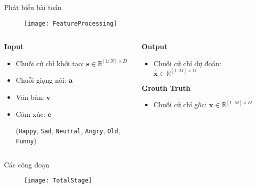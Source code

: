 \begin{frame}{Phát biểu bài toán}
 \vspace{-25pt}
	\begin{figure}
		\centering
		\texttt{[image: FeatureProcessing]}
	\end{figure}
		\vspace{20pt}
	\begin{columns}
		
	\begin{column}{0.6\textwidth}
		
		\textbf{Input}
		\begin{itemize}
			\item Chuỗi cử chỉ khởi tạo: $\mathbf{s} \in \mathbb{R}^{[1:N] \times D}$
			\item Chuỗi giọng nói: $\mathbf{a}$
			\item Văn bản: $\mathbf{v}$ 
			\item Cảm xúc: $\mathbf{e}$ 
			
			{\small
				(\texttt{Happy},  \texttt{Sad},  \texttt{Neutral}, \texttt{Angry}, \texttt{Old}, \texttt{Funny})
			}
		\end{itemize}
		
	\end{column}

	\begin{column}{0.4\textwidth}
		\textbf{Output}
		\begin{itemize}
			\item Chuỗi cử chỉ dự đoán: $\hat{\mathbf{x}} \in \mathbb{R}^{[1:M] \times D}$
		\end{itemize}
		
		\textbf{Grouth Truth}
		\begin{itemize}
			\item Chuỗi cử chỉ gốc: $\mathbf{x}  \in \mathbb{R}^{[1:M] \times D}$
		\end{itemize}
	\end{column}
\end{columns}
	
\end{frame}




\begin{frame}{Các công đoạn}
	\begin{figure}[h]
		\centering
		\texttt{[image: TotalStage]}
	\end{figure}
\end{frame}



